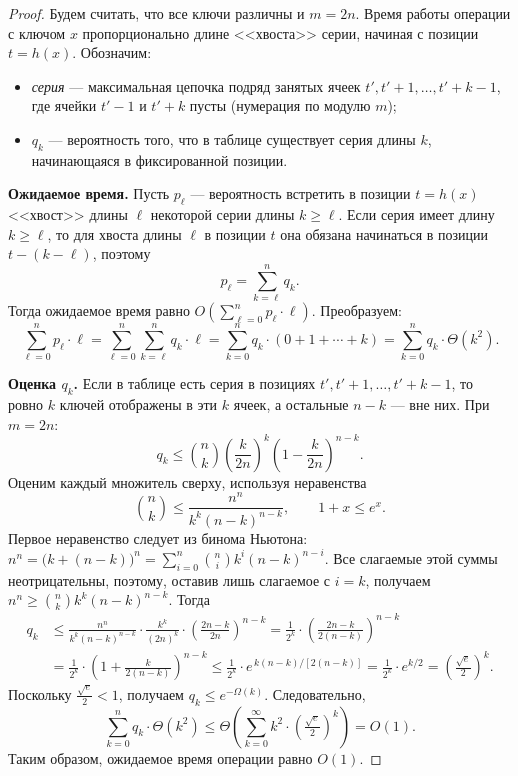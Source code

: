 \begin{proof}
	Будем считать, что все ключи различны и $m = 2n$. Время работы операции с ключом $x$ пропорционально длине <<хвоста>> серии, начиная с позиции $t = h(x)$. Обозначим:
	\begin{itemize}
		\item \emph{серия} --- максимальная цепочка подряд занятых ячеек $t', t'+1, \ldots, t'+k-1$, где ячейки $t'-1$ и $t'+k$ пусты (нумерация по модулю $m$);
		\item $q_k$ --- вероятность того, что в таблице существует серия длины $k$, начинающаяся в фиксированной позиции.
	\end{itemize}
	
	\textbf{Ожидаемое время.} Пусть $p_\ell$ --- вероятность встретить в позиции $t = h(x)$ <<хвост>> длины $\ell$ некоторой серии длины $k \geq \ell$. Если серия имеет длину $k \geq \ell$, то для хвоста длины $\ell$ в позиции $t$ она обязана начинаться в позиции $t - (k-\ell)$, поэтому
	\[
	p_\ell = \sum_{k=\ell}^{n} q_k.
	\]
	Тогда ожидаемое время равно $O\!\left(\sum_{\ell=0}^{n} p_\ell \cdot \ell\right)$. Преобразуем:
	\[
	\sum_{\ell=0}^{n} p_\ell \cdot \ell
	= \sum_{\ell=0}^{n} \sum_{k=\ell}^{n} q_k \cdot \ell
	= \sum_{k=0}^{n} q_k \cdot (0 + 1 + \cdots + k)
	= \sum_{k=0}^{n} q_k \cdot \Theta(k^2).
	\]
	
	\textbf{Оценка $q_k$.} Если в таблице есть серия в позициях $t', t'+1, \ldots, t'+k-1$, то ровно $k$ ключей отображены в эти $k$ ячеек, а остальные $n-k$ --- вне них. При $m = 2n$:
	\[
	q_k \leq \binom{n}{k}
	\left(\frac{k}{2n}\right)^{k}
	\left(1 - \frac{k}{2n}\right)^{n-k}.
	\]
	Оценим каждый множитель сверху, используя неравенства
	\[
	\binom{n}{k} \leq \frac{n^n}{k^k(n-k)^{n-k}},
	\qquad
	1+x \leq e^x.
	\]
	Первое неравенство следует из бинома Ньютона: $n^n = \bigl(k + (n-k)\bigr)^n = \sum_{i=0}^{n} \binom{n}{i} k^i (n-k)^{n-i}$. Все слагаемые этой суммы неотрицательны, поэтому, оставив лишь слагаемое с $i = k$, получаем $n^n \ge \binom{n}{k} k^k (n-k)^{n-k}$. Тогда
	\begin{align*}
		q_k
		&\leq
		\frac{n^n}{k^k(n-k)^{n-k}}
		\cdot
		\frac{k^k}{(2n)^k}
		\cdot
		\left(\frac{2n-k}{2n}\right)^{n-k}
		=
		\frac{1}{2^k}
		\cdot
		\left(\frac{2n-k}{2(n-k)}\right)^{n-k} \\
		&=
		\frac{1}{2^k}
		\cdot
		\left(1 + \frac{k}{2(n-k)}\right)^{n-k}
		\leq
		\frac{1}{2^k}
		\cdot
		e^{\,k(n-k)/[2(n-k)]}
		=
		\frac{1}{2^k} \cdot e^{k/2}
		=
		\left(\frac{\sqrt{e}}{2}\right)^k.
	\end{align*}
	Поскольку $\tfrac{\sqrt{e}}{2} < 1$, получаем $q_k \leq e^{-\Omega(k)}$. Следовательно,
	\[
	\sum_{k=0}^{n} q_k \cdot \Theta(k^2)
	\leq \Theta\!\left(\sum_{k=0}^{\infty} k^2 \cdot \left(\tfrac{\sqrt{e}}{2}\right)^k\right) = O(1).
	\]
	Таким образом, ожидаемое время операции равно $O(1)$.
\end{proof}